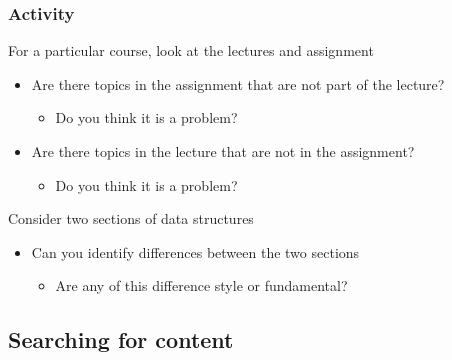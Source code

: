 \documentclass[aspectratio=169]{beamer}
\begin{document}
\begin{frame}
  \frametitle{Activity}

  \begin{block}{For a particular course, look at the lectures and assignment}
    
    \begin{itemize}
    \item Are there topics in the assignment that are not part of the lecture?
      \begin{itemize}
      \item Do you think it is a problem?
      \end{itemize}
    \item Are there topics in the lecture that are not in the assignment?
      \begin{itemize}
      \item Do you think it is a problem?
      \end{itemize}
    \end{itemize}
    
  \end{block}
  
  \begin{block}{Consider two sections of data structures}
    \begin{itemize}
    \item Can you identify differences between the two sections
      \begin{itemize}
      \item Are any of this difference style or fundamental?
      \end{itemize}
    \end{itemize}
  \end{block}
\end{frame}

\subsection{Searching for content}
\end{document}
